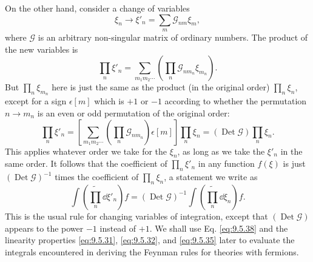 On the other hand, consider a change of variables
\begin{equation}
\xi_n\longrightarrow\xi'_n=\sum_m\mathcal{G}_{nm}\xi_m,
\tag{9.5.37}\label{eq:9.5.37}
\end{equation}
where $\mathcal{G}$ is an arbitrary non-singular matrix of ordinary numbers.
The product of the new variables is
\[
\prod_n\xi'_n
=\sum_{m_1m_2\cdots}\left(\prod_n\mathcal{G}_{nm_n}\xi_{m_n}\right).
\]
But $\prod_n\xi_{m_n}$ here is just the same as the product (in the original
order) $\prod_n\xi_n$, except for a sign $\epsilon[m]$ which is $+1$ or $-1$
according to whether the permutation $n\to m_n$ is an even or odd permutation
of the original order:
\[
\prod_n\xi'_n
=\left[\sum_{m_1m_2\cdots}
 \left(\prod_n\mathcal{G}_{nm_n}\right)\epsilon[m]\right]
 \prod_n\xi_n
=(\operatorname{Det}\mathcal{G})\prod_n\xi_n.
\]
This applies whatever order we take for the $\xi_n$, as long as we take the
$\xi'_n$ in the same order. It follows that the coefficient of
$\prod_n\xi'_n$ in any function $f(\xi)$ is just
$(\operatorname{Det}\mathcal{G})^{-1}$ times the coefficient of
$\prod_n\xi_n$, a statement we write as
\begin{equation}
\int\left(\widetilde{\prod_n}\dd\xi'_n\right)f
=(\operatorname{Det}\mathcal{G})^{-1}
 \int\left(\widetilde{\prod_n}\dd\xi_n\right)f.
\tag{9.5.38}\label{eq:9.5.38}
\end{equation}
This is the usual rule for changing variables of integration, except that
$(\operatorname{Det}\mathcal{G})$ appears to the power $-1$ instead of $+1$.
We shall use Eq. \eqref{eq:9.5.38} and the linearity properties \eqref{eq:9.5.31}, \eqref{eq:9.5.32}, and
\eqref{eq:9.5.35} later to evaluate the integrals encountered in deriving the Feynman
rules for theories with fermions.

